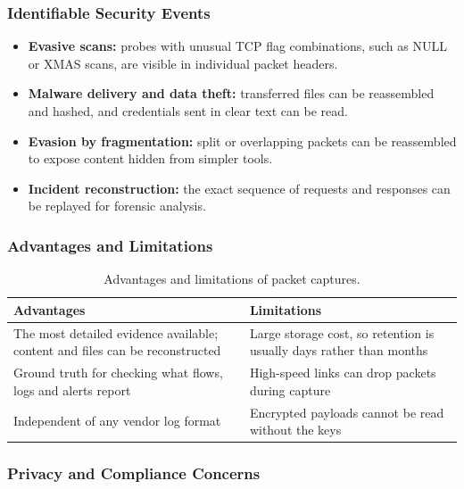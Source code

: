 \subsubsection{Identifiable Security Events}

\begin{itemize}
  \item \textbf{Evasive scans:} probes with unusual TCP flag combinations, such as NULL or XMAS scans, are visible in individual packet headers.
  \item \textbf{Malware delivery and data theft:} transferred files can be reassembled and hashed, and credentials sent in clear text can be read.
  \item \textbf{Evasion by fragmentation:} split or overlapping packets can be reassembled to expose content hidden from simpler tools.
  \item \textbf{Incident reconstruction:} the exact sequence of requests and responses can be replayed for forensic analysis.
\end{itemize}

\subsubsection{Advantages and Limitations}

\begin{table}[htbp]
  \centering
  \caption{Advantages and limitations of packet captures.}
  \label{tab:pcap-pros}
  \begin{tabularx}{\linewidth}{@{}YY@{}}
    \toprule
    \textbf{Advantages} & \textbf{Limitations} \\
    \midrule
    The most detailed evidence available; content and files can be reconstructed
      & Large storage cost, so retention is usually days rather than months \\
    Ground truth for checking what flows, logs and alerts report
      & High-speed links can drop packets during capture \\
    Independent of any vendor log format
      & Encrypted payloads cannot be read without the keys \\
    \bottomrule
  \end{tabularx}
\end{table}

\subsubsection{Privacy and Compliance Concerns}

